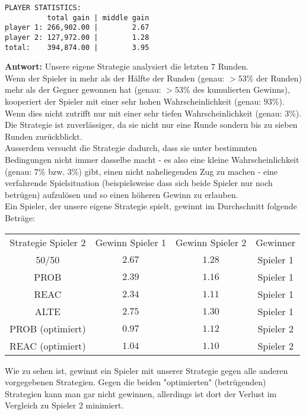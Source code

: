 \documentclass[12pt,a4paper]{article}
\begin{document}
\begin{enumerate}
\begin{verbatim}
PLAYER STATISTICS:
          total gain | middle gain
player 1: 266,902.00 |        2.67
player 2: 127,972.00 |        1.28
total:    394,874.00 |        3.95
\end{verbatim}
\textbf{Antwort:} Unsere eigene Strategie analysiert die letzten $7$ Runden.\\
Wenn der Spieler in mehr als der Hälfte der Runden (genau: $>53\%$ der Runden) mehr als der Gegner gewonnen hat (genau: $>53\%$ des kumulierten Gewinns),
kooperiert der Spieler mit einer sehr hohen Wahrscheinlichkeit (genau: $93\%$).\\
Wenn dies nicht zutrifft nur mit einer sehr tiefen Wahrscheinlichkeit (genau: $3\%$).\\
Die Strategie ist zuverlässiger, da sie nicht nur eine Runde sondern bis zu sieben Runden zurückblickt.\\
Ausserdem versucht die Strategie dadurch, dass sie unter bestimmten Bedingungen nicht immer dasselbe macht - es also eine kleine Wahrscheinlichkeit (genau: $7\%$ bzw. $3\%$) gibt,
einen nicht naheliegenden Zug zu machen - eine verfahrende Spielsituation (beispielsweise dass sich beide Spieler nur noch betrügen) aufzulösen und so einen höheren Gewinn zu erlauben.\\
Ein Spieler, der unsere eigene Strategie spielt, gewinnt im Durchschnitt folgende Beträge:
\begin{center}
\begin{tabular}{c c c c}
 Strategie Spieler 2 & Gewinn Spieler 1 & Gewinn Spieler 2 & Gewinner \\
        50/50        &      $2.67$      &      $1.28$      & Spieler 1\\
        PROB         &      $2.39$      &      $1.16$      & Spieler 1\\
        REAC         &      $2.34$      &      $1.11$      & Spieler 1\\
        ALTE         &      $2.75$      &      $1.30$      & Spieler 1\\
   PROB (optimiert)  &      $0.97$      &      $1.12$      & Spieler 2\\
   REAC (optimiert)  &      $1.04$      &      $1.10$      & Spieler 2
\end{tabular}
\end{center}
Wie zu sehen ist, gewinnt ein Spieler mit unserer Strategie gegen alle anderen vorgegebenen Strategien.
Gegen die beiden "optimierten" (betrügenden) Strategien kann man gar nicht gewinnen, allerdings ist dort der Verlust im Vergleich zu Spieler 2 minimiert.
\end{enumerate}
\end{document}
